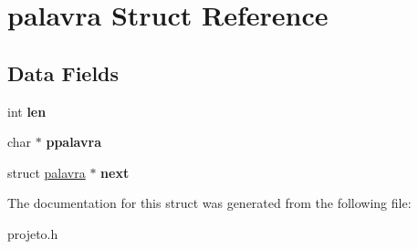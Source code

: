 \hypertarget{structpalavra}{}\section{palavra Struct Reference}
\label{structpalavra}
\subsection*{Data Fields}
\begin{DoxyCompactItemize}
\item 
\mbox{\label{structpalavra_afed088663f8704004425cdae2120b9b3}} 
int {\bfseries len}
\item 
\mbox{\label{structpalavra_aac40bbaa9a1fa26b774aff5e9c4aed15}} 
char $\ast$ {\bfseries ppalavra}
\item 
\mbox{\label{structpalavra_afded7ecacbe32cc40415aedd391f6bda}} 
struct \mbox{\hyperlink{structpalavra}{palavra}} $\ast$ {\bfseries next}
\end{DoxyCompactItemize}


The documentation for this struct was generated from the following file\+:\begin{DoxyCompactItemize}
\item 
projeto.\+h\end{DoxyCompactItemize}
